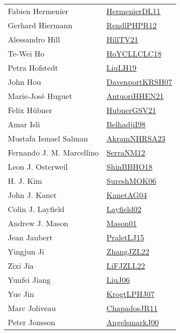 {\begin{longtable}{p{4cm}p{20cm}}
Fabien Hermenier & \href{papers/HermenierDL11.pdf}{HermenierDL11}\cite{HermenierDL11} \\
Gerhard Hiermann & \href{papers/RendlPHPR12.pdf}{RendlPHPR12}\cite{RendlPHPR12} \\
Alessandro Hill & \href{papers/HillTV21.pdf}{HillTV21}\cite{HillTV21} \\
Te{-}Wei Ho & \href{papers/HoYCLLCLC18.pdf}{HoYCLLCLC18}\cite{HoYCLLCLC18} \\
Petra Hofstedt & \href{papers/LiuLH19.pdf}{LiuLH19}\cite{LiuLH19} \\
John Hou & \href{papers/DavenportKRSH07.pdf}{DavenportKRSH07}\cite{DavenportKRSH07} \\
Marie{-}Jos{\'{e}} Huguet & \href{papers/AntuoriHHEN21.pdf}{AntuoriHHEN21}\cite{AntuoriHHEN21} \\
Felix H{\"{u}}bner & \href{articles/HubnerGSV21.pdf}{HubnerGSV21}\cite{HubnerGSV21} \\
Amar Isli & \href{articles/BelhadjiI98.pdf}{BelhadjiI98}\cite{BelhadjiI98} \\
Mustafa Ismael Salman & \href{articles/AkramNHRSA23.pdf}{AkramNHRSA23}\cite{AkramNHRSA23} \\
Fernando J. M. Marcellino & \href{papers/SerraNM12.pdf}{SerraNM12}\cite{SerraNM12} \\
Leon J. Osterweil & \href{articles/ShinBBHO18.pdf}{ShinBBHO18}\cite{ShinBBHO18} \\
H. J. Kim & \href{}{SureshMOK06}\cite{SureshMOK06} \\
John J. Kanet & \href{}{KanetAG04}\cite{KanetAG04} \\
Colin J. Layfield & \href{}{Layfield02}\cite{Layfield02} \\
Andrew J. Mason & \href{articles/Mason01.pdf}{Mason01}\cite{Mason01} \\
Jean Jaubert & \href{papers/PraletLJ15.pdf}{PraletLJ15}\cite{PraletLJ15} \\
Yingjun Ji & \href{papers/ZhangJZL22.pdf}{ZhangJZL22}\cite{ZhangJZL22} \\
Zixi Jia & \href{papers/LiFJZLL22.pdf}{LiFJZLL22}\cite{LiFJZLL22} \\
Yunfei Jiang & \href{papers/LiuJ06.pdf}{LiuJ06}\cite{LiuJ06} \\
Yue Jin & \href{papers/KrogtLPHJ07.pdf}{KrogtLPHJ07}\cite{KrogtLPHJ07} \\
Marc Joliveau & \href{papers/ChapadosJR11.pdf}{ChapadosJR11}\cite{ChapadosJR11} \\
Peter Jonsson & \href{papers/AngelsmarkJ00.pdf}{AngelsmarkJ00}\cite{AngelsmarkJ00} \\

\end{longtable}}
